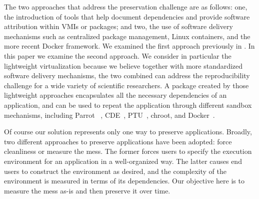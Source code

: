 
The two approaches that address the preservation challenge are as follows: one, the introduction of tools that help document dependencies and provide software attribution within VMIs or packages; and two, the use of software delivery mechanisms such as centralized package management, Linux containers, and the more recent Docker framework. We examined the first approach previously in \cite{SoftProv}. 
In this paper we examine the second approach.  We consider in particular the lightweight virtualization because we believe together with more standardized software delivery mechanisms, the two combined can address the reproducibility challenge for a wide variety of scientific researchers. A package created by those lightweight approaches encapsulates all the necessary dependencies of an application, and can be used to repeat the application through different sandbox mechanisms, including Parrot
~\cite{thain2005parrot}, CDE~\cite{Guo}, PTU~\cite{PTU}, chroot, and Docker~\cite{boettiger2015introduction}. 

Of course our solution represents only one way to preserve applications. Broadly, two different approaches to preserve applications have been adopted: force cleanliness or measure the mess. The former forces users to specify the execution environment for an application in a well-organized way. The latter causes end users to construct the environment as desired, and the complexity of the environment is measured in terms of its dependencies. Our objective here is to measure the mess as-is and then preserve it over time.



